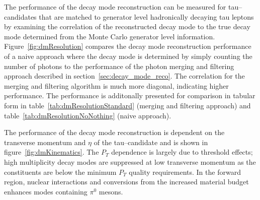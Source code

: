 The performance of the decay mode reconstruction can be measured for
tau--candidates that are matched to generator level hadronically decaying tau
leptons by examining the correlation of the reconstructed decay mode to the true
decay mode determined from the Monte Carlo generator level information.
Figure~\ref{fig:dmResolution} compares the decay mode reconstruction performance
of a naive approach where the decay mode is determined by simply counting the
number of photons to the performance of the photon merging and filtering
approach described in section~\ref{sec:decay_mode_reco}.  The correlation for
the merging and filtering algorithm is much more diagonal, indicating higher
performance.  The performance is additonally presented for comparison in tabular form in
table~\ref{tab:dmResolutionStandard} (merging and filtering approach) and
table~\ref{tab:dmResolutionNoNothing} (naive approach).

The performance of the decay mode reconstruction is dependent on the transverse
momentum and $\eta$ of the tau--candidate and is shown in
figure~\ref{fig:dmKinematics}.  The $P_T$ dependence is largely due to
threshold effects; high multiplicity decay modes are suppressed at low
transverse momentum as the constituents are below the minimum $P_T$ quality
requirements.  In the forward region, nuclear interactions and conversions from
the increased material budget enhances modes containing $\pi^0$ mesons.




